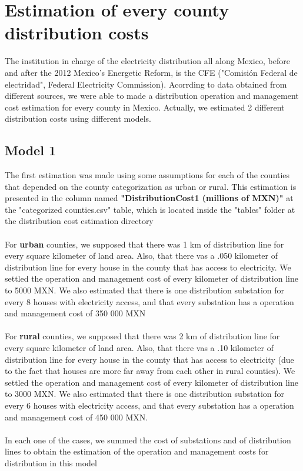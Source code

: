 \documentclass[•]{article}
\begin{document}
\section{Estimation of every county distribution costs}
The institution in charge of the electricity distribution all along Mexico, before and after the 2012 Mexico's Energetic Reform, is the CFE ("Comisión Federal de electridad", Federal Electricity Commission). Acorrding to data obtained from different sources, we were able to made a distribution operation and management cost estimation for every county in Mexico. Actually, we estimated 2 different distribution costs using different models.
\subsection{Model 1}
The first estimation was made using some assumptions for each of the counties that depended on the county categorization as urban or rural. This estimation is presented in the column named \textbf{"DistributionCost1 (millions of MXN)"} at the "categorized counties.csv" table, which is located inside the "tables" folder at the distribution cost estimation directory
\\
\\For \textbf{urban} counties, we supposed that there was 1 km of distribution line for every square kilometer of land area. Also, that there vas a .050 kilometer of distribution line for every house in the county that has access to electricity. We settled the operation and management cost of every kilometer of distribution line to 5000 MXN. We also estimated that there is one distribution substation for every  8 houses with electricity access, and that every substation has a operation and management cost of 350 000 MXN
\\
\\For \textbf{rural} counties, we supposed that there was 2 km of distribution line for every square kilometer of land area. Also, that there vas a .10 kilometer of distribution line for every house in the county that has access to electricity (due to the fact that houses are more far away from each other in rural counties). We settled the operation and management cost of every kilometer of distribution line to 3000 MXN. We also estimated that there is one distribution substation for every  6 houses with electricity access, and that every substation has a operation and management cost of 450 000 MXN.
\\
\\In each one of the cases, we summed the cost of substations and of distribution lines to obtain the estimation of the operation and management costs for distribution in this model
\end{document}

